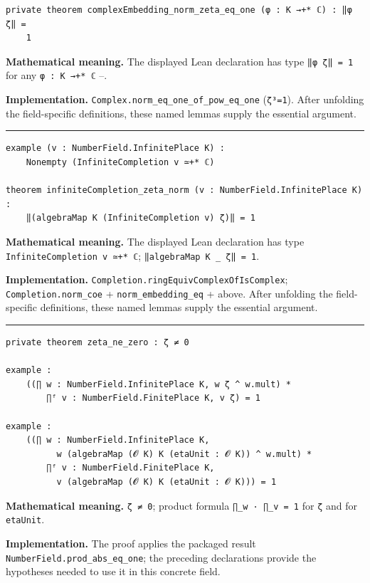 \documentclass[UTF8,a4paper,11pt,fontset=fandol]{ctexart}
\theoremstyle{definition}
\newcommand{\statementsep}{\par\medskip\hrule\medskip}
\begin{document}
\begin{verbatim}
private theorem complexEmbedding_norm_zeta_eq_one (φ : K →+* ℂ) : ‖φ ζ‖ =
    1
\end{verbatim}
\noindent\textbf{Mathematical meaning.} The displayed Lean declaration has type \texttt{‖φ ζ‖ = 1} for any \texttt{φ : K →+* ℂ} --.\par
\noindent\textbf{Implementation.} \texttt{Complex.\allowbreak{}norm\_\allowbreak{}eq\_\allowbreak{}one\_\allowbreak{}of\_\allowbreak{}pow\_\allowbreak{}eq\_\allowbreak{}one} (\texttt{ζ³=1}). After unfolding the field-specific definitions, these named lemmas supply the essential argument.\par
\statementsep
\begin{verbatim}
example (v : NumberField.InfinitePlace K) :
    Nonempty (InfiniteCompletion v ≃+* ℂ)

theorem infiniteCompletion_zeta_norm (v : NumberField.InfinitePlace K) :
    ‖(algebraMap K (InfiniteCompletion v) ζ)‖ = 1
\end{verbatim}
\noindent\textbf{Mathematical meaning.} The displayed Lean declaration has type \texttt{InfiniteCompletion v ≃+* ℂ}; \texttt{‖algebraMap K \_\allowbreak{} ζ‖ = 1}.\par
\noindent\textbf{Implementation.} \texttt{Completion.\allowbreak{}ringEquivComplexOfIsComplex}; \texttt{Completion.\allowbreak{}norm\_\allowbreak{}coe} + \texttt{norm\_\allowbreak{}embedding\_\allowbreak{}eq} + above. After unfolding the field-specific definitions, these named lemmas supply the essential argument.\par
\statementsep
\begin{verbatim}
private theorem zeta_ne_zero : ζ ≠ 0

example :
    ((∏ w : NumberField.InfinitePlace K, w ζ ^ w.mult) *
        ∏ᶠ v : NumberField.FinitePlace K, v ζ) = 1

example :
    ((∏ w : NumberField.InfinitePlace K,
          w (algebraMap (𝓞 K) K (etaUnit : 𝓞 K)) ^ w.mult) *
        ∏ᶠ v : NumberField.FinitePlace K,
          v (algebraMap (𝓞 K) K (etaUnit : 𝓞 K))) = 1
\end{verbatim}
\noindent\textbf{Mathematical meaning.} \texttt{ζ ≠ 0}; product formula \texttt{∏\_\allowbreak{}w · ∏\_\allowbreak{}v = 1} for \texttt{ζ} and for \texttt{etaUnit}.\par
\noindent\textbf{Implementation.} The proof applies the packaged result \texttt{NumberField.\allowbreak{}prod\_\allowbreak{}abs\_\allowbreak{}eq\_\allowbreak{}one}; the preceding declarations provide the hypotheses needed to use it in this concrete field.\par
\end{document}
